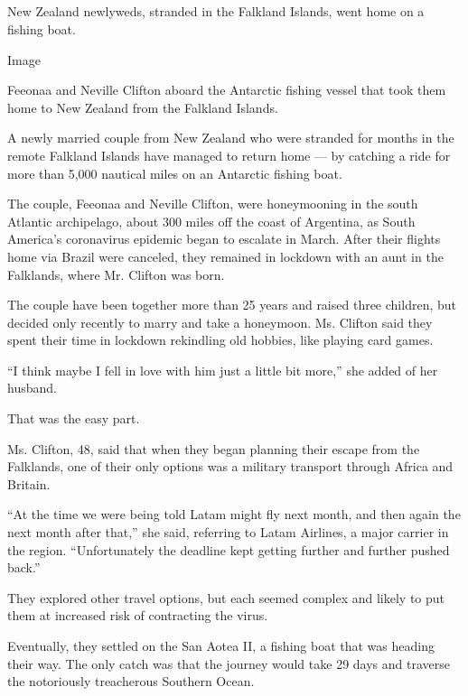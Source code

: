 \hypertarget{-6}{%
\subsection{}\label{-6}}

New Zealand newlyweds, stranded in the Falkland Islands, went home on a
fishing boat.

Image

Feeonaa and Neville Clifton aboard the Antarctic fishing vessel that
took them home to New Zealand from the Falkland Islands.

A newly married couple from New Zealand who were stranded for months in
the remote Falkland Islands have managed to return home --- by catching
a ride for more than 5,000 nautical miles on an Antarctic fishing boat.

The couple, Feeonaa and Neville Clifton, were honeymooning in the south
Atlantic archipelago, about 300 miles off the coast of Argentina, as
South America's coronavirus epidemic began to escalate in March. After
their flights home via Brazil were canceled, they remained in lockdown
with an aunt in the Falklands, where Mr. Clifton was born.

The couple have been together more than 25 years and raised three
children, but decided only recently to marry and take a honeymoon. Ms.
Clifton said they spent their time in lockdown rekindling old hobbies,
like playing card games.

``I think maybe I fell in love with him just a little bit more,'' she
added of her husband.

That was the easy part.

Ms. Clifton, 48, said that when they began planning their escape from
the Falklands, one of their only options was a military transport
through Africa and Britain.

``At the time we were being told Latam might fly next month, and then
again the next month after that,'' she said, referring to Latam
Airlines, a major carrier in the region. ``Unfortunately the deadline
kept getting further and further pushed back.''

They explored other travel options, but each seemed complex and likely
to put them at increased risk of contracting the virus.

Eventually, they settled on the San Aotea II, a fishing boat that was
heading their way. The only catch was that the journey would take 29
days and traverse the notoriously treacherous Southern Ocean.

